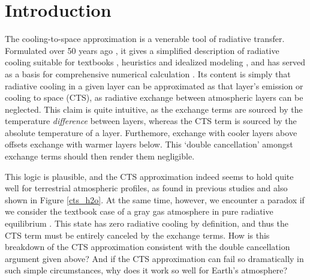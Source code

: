 \documentclass[10pt]{article}
\begin{document}
%
%


\section {Introduction}
The cooling-to-space approximation is a venerable tool of radiative transfer. Formulated over 50 years ago \citep{green1967, rodgers1966}, it gives a simplified description of radiative cooling suitable for textbooks \citep{wallace2006,petty2006,thomas2002}, heuristics and idealized modeling \citep{jeevanjee2019,jeevanjee2018}, and  has served as a basis for comprehensive numerical calculation \citep[][]{joseph1976,fels1975,rodgers1966}. Its content is simply that radiative cooling in a given layer can be approximated as that layer's emission or cooling to space (CTS), as radiative exchange between atmospheric layers can be neglected. This claim  is quite intuitive, as  the  exchange terms   are sourced by the temperature \emph{difference} between layers, whereas the CTS term is sourced by the absolute temperature of a layer. Furthemore,   exchange with cooler layers above  offsets  exchange with warmer layers below. This `double cancellation' amongst exchange terms should then render them negligible.


This logic is plausible, and the CTS approximation indeed seems to hold quite well for terrestrial atmospheric profiles, as found in previous studies \citep[e.g.][]{clough1992,rodgers1966} and also shown in Figure \ref{cts_h2o}. At the same time, however, we encounter a paradox if we consider the textbook case of a gray gas atmosphere in pure radiative equilibrium \citep[PRE, e.g.][]{pierrehumbert2010}. This state has zero radiative cooling by definition, and thus the CTS term must be entirely canceled by the exchange terms.    How is this breakdown of the CTS approximation consistent  with the double cancellation argument given above? And if the CTS approximation can fail so dramatically in such simple circumstances, why does it work so well for Earth's atmosphere?
\end{document}
